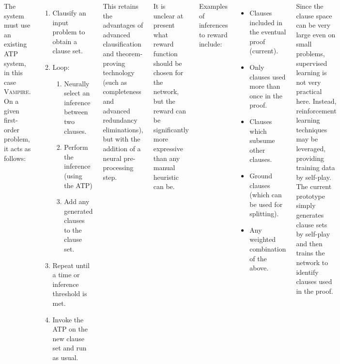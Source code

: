 \documentclass[24pt, a1paper, portrait]{tikzposter}
\newcommand{\vampire}{\textsc{Vampire}}
\begin{document}
\begin{columns}
{
	The system must use an existing ATP system, in this case \vampire{}.
	On a given first-order problem, it acts as follows:
	\begin{enumerate}[leftmargin=1in]
		\item Clausify an input problem to obtain a clause set.
		\item Loop:
			\begin{enumerate}[leftmargin=1in]
				\item Neurally select an inference between two clauses.
				\item Perform the inference (using the ATP)
				\item Add any generated clauses to the clause set.
			\end{enumerate}
		\item Repeat until a time or inference threshold is met.
		\item Invoke the ATP on the new clause set and run as usual.
	\end{enumerate}
	\vspace{.5in}
	This retains the advantages of advanced clausification and theorem-proving technology (such as completeness and advanced redundancy eliminations), but with the addition of a neural pre-processing step.
}

{
	It is unclear at present what reward function should be chosen for the network, but the reward can be significantly more expressive than any manual heuristic can be.

	Examples of inferences to reward include:
	\begin{itemize}[leftmargin=1in]
		\item Clauses included in the eventual proof (current).
		\item Only clauses used more than once in the proof.
		\item Clauses which subsume other clauses.
		\item Ground clauses (which can be used for splitting).
		\item Any weighted combination of the above.
	\end{itemize}
	\vspace{.5in}
	Since the clause space can be very large even on small problems, supervised learning is not very practical here.
	Instead, reinforcement learning techniques may be leveraged, providing training data by self-play.
	The current prototype simply generates clause sets by self-play and then trains the network to identify clauses used in the proof.
}


\end{columns}
\end{document}
